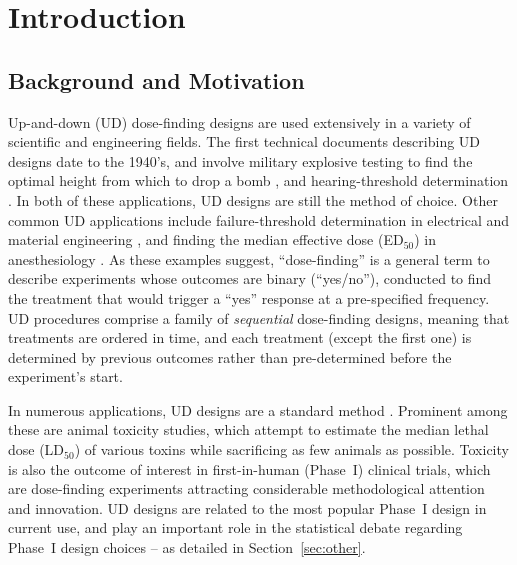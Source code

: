 

\doublespacing




\section{Introduction}\label{sec:intro}
\subsection{Background and Motivation}

Up-and-down (UD) dose-finding designs are used extensively in a variety of scientific and engineering fields. The first technical documents describing UD designs date to the 1940's, and involve military explosive testing to find the optimal height from which to drop a bomb  \citep{Ande:McCa:Tuke:Stai:1946,Dixo:Mood:Amet:1948}, and hearing-threshold determination \citep{vonB:anew:1947}. In both of these applications, UD designs are still the method of choice. Other common UD applications include failure-threshold determination in electrical and material engineering \citep{Lago:Sons:Comp:2004}, and finding the median effective dose (ED$_{50}$) in anesthesiology \citep{Pace:styl:tutor:2007}. As these examples suggest, ``dose-finding'' is a general term to describe experiments whose outcomes are binary (``yes/no''), conducted to find the treatment that would trigger a ``yes'' response at a pre-specified frequency. UD procedures comprise a family of \emph{sequential} dose-finding designs, meaning that treatments are ordered in time, and each treatment (except the first one) is determined by previous outcomes rather than pre-determined before the experiment's start.

In numerous applications, UD designs are a standard method \citep[e.g.,][]{JSME81, ASTM:Stan:1991,OECD:Revi:1998,NIEH:NIH:2001}. Prominent among these are animal toxicity studies, which attempt to estimate the median lethal dose (LD$_{50}$) of various toxins while sacrificing as few animals as possible. Toxicity is also the outcome of interest in first-in-human (Phase~I) clinical trials, which are dose-finding experiments attracting considerable methodological attention and innovation. UD designs are related to the most popular Phase~I design in current use, and play an important role in the statistical debate regarding Phase~I design choices -- as detailed in Section~\ref{sec:other}.

